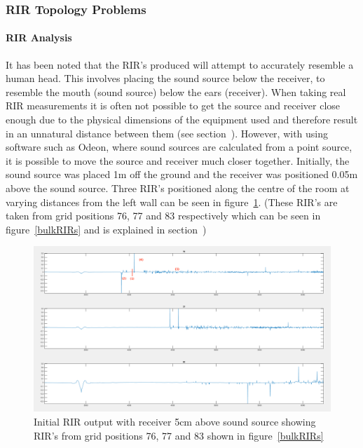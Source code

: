 \documentclass[../../main.tex]{subfiles}
\begin{document}
		\subsubsection{RIR Topology Problems}
		\label{odeonError}

			\paragraph{RIR Analysis}
			It has been noted that the \ac{RIR}'s produced will attempt to accurately resemble a human head. This involves placing the sound source below the receiver, to resemble the mouth (sound source) below the ears (receiver). When taking real \ac{RIR} measurements it is often not possible to get the source and receiver close enough due to the physical dimensions of the equipment used and therefore result in an unnatural distance between them (see section~). However, with using software such as Odeon, where sound sources are calculated from a point source, it is possible to move the source and receiver much closer together. Initially, the sound source was placed 1m off the ground and the receiver was positioned 0.05m above the sound source. Three \ac{RIR}'s positioned along the centre of the room at varying distances from the left wall can be seen in figure~\ref{incorrectRIR}. (These \ac{RIR}'s are taken from grid positions 76, 77 and 83 respectively which can be seen in figure~\ref{bulkRIRs} and is explained in section~)

			


			\begin{figure}[H]
				\centerline{\includegraphics[scale = 0.33]{Sections/Implementation/Odeon/images/incorrectRIR/RIR_76_incorrect_edit.png}}
				\caption{Initial \ac{RIR} output with receiver 5cm above sound source showing \ac{RIR}'s from grid positions 76, 77 and 83 shown in figure~\ref{bulkRIRs}}
				\label{incorrectRIR}
			\end{figure}
\end{document}
